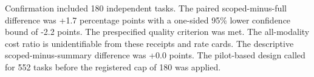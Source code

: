 Confirmation included 180 independent tasks. The paired scoped-minus-full difference was +1.7 percentage points with a one-sided 95\% lower confidence bound of -2.2 points. The prespecified quality criterion was met. The all-modality cost ratio is unidentifiable from these receipts and rate cards. The descriptive scoped-minus-summary difference was +0.0 points. The pilot-based design called for 552 tasks before the registered cap of 180 was applied.
